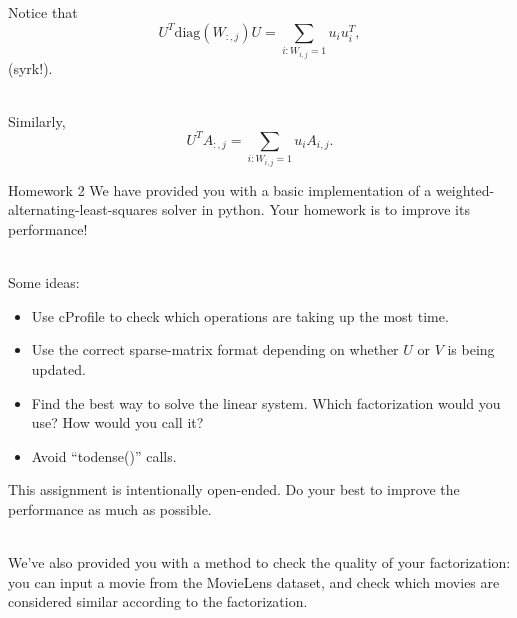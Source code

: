 \documentclass[12pt]{beamer}
\begin{document}
\begin{frame}
Notice that 
	$$U^T \mbox{diag}(W_{:,j}) U = \sum_{i: W_{i,j} = 1} u_i u_i^T, $$
(syrk!).
\\~

Similarly,
$$ U^T A_{:,j} = \sum_{i: W_{i,j} = 1} u_i A_{i,j}. $$
\end{frame}

\begin{frame}{Homework 2}
We have provided you with a basic implementation of a weighted-alternating-least-squares solver in python. Your homework is to improve its performance!
\\~

Some ideas:
\begin{itemize}
\item Use cProfile to check which operations are taking up the most time.
\item Use the correct sparse-matrix format depending on whether $U$ or $V$ is being updated.
\item Find the best way to solve the linear system. Which factorization would you use? How would you call it?
\item Avoid ``todense()'' calls.
\end{itemize}
\end{frame}

\begin{frame}
This assignment is intentionally open-ended. Do your best to improve the performance as much as possible.
\\~

We've also provided you with a method to check the quality of your factorization: you can input a movie from the MovieLens dataset, and check which movies are considered similar according to the factorization.
\end{frame}
\end{document}
